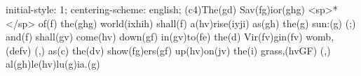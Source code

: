 initial-style: 1;
centering-scheme: english;
(c4)The(gd) Sav(fg)ior(ghg) <sp>*</sp> of(f) the(ghg) world(ixhih) shall(f) a(hv)rise(iyji) as(gh) the(g) sun:(g) (;) and(f) shall(gv) come(hv) down(gf) in(gv)to(fe) the(d) Vir(fv)gin(fv) womb,(defv) (,) as(c) the(dv) show(fg)ers(gf) up(hv)on(jv) the(i) grass,(hvGF) (,) al(gh)le(hv)lu(g)ia.(g)
